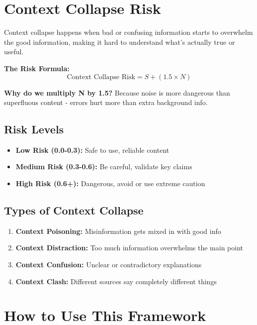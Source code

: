 \documentclass[11pt,a4paper]{article}
\begin{document}
\section{Context Collapse Risk}

\begin{tcolorbox}[colback=warningred!10,colframe=warningred,title=What is Context Collapse?]
Context collapse happens when bad or confusing information starts to overwhelm the good information, making it hard to understand what's actually true or useful.
\end{tcolorbox}

\textbf{The Risk Formula:}
\[ \text{Context Collapse Risk} = S + (1.5 \times N) \]

\textbf{Why do we multiply N by 1.5?} Because noise is more dangerous than superfluous content - errors hurt more than extra background info.

\subsection{Risk Levels}
\begin{itemize}
\item \textbf{Low Risk (0.0-0.3):} Safe to use, reliable content
\item \textbf{Medium Risk (0.3-0.6):} Be careful, validate key claims
\item \textbf{High Risk (0.6+):} Dangerous, avoid or use extreme caution
\end{itemize}

\subsection{Types of Context Collapse}
\begin{enumerate}
\item \textbf{Context Poisoning:} Misinformation gets mixed in with good info
\item \textbf{Context Distraction:} Too much information overwhelms the main point
\item \textbf{Context Confusion:} Unclear or contradictory explanations
\item \textbf{Context Clash:} Different sources say completely different things
\end{enumerate}

\section{How to Use This Framework}
\end{document}
